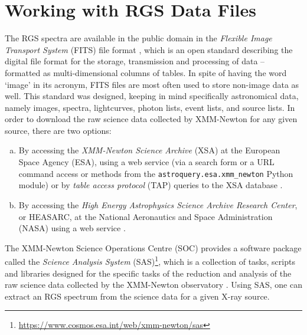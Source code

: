    \section{Working with RGS Data Files} \label{tool:rgs-files}
        The RGS spectra are available in the public domain in the \textit{Flexible Image Transport System} (FITS) file format \cite{chiappetti2018definition}, which is an open standard describing the digital file format for the storage, transmission and processing of data – formatted as multi-dimensional columns of tables. In spite of having the word `image' in its acronym, FITS files are most often used to store non-image data as well. This standard was designed, keeping in mind specifically astronomical data, namely images, spectra, lightcurves, photon lists, event lists, and source lists. In order to download the raw science data collected by XMM-Newton for any given source, there are two options:
        \begin{enumerate}[a)]
            \item By accessing the \textit{XMM-Newton Science Archive} (XSA) at the European Space Agency (ESA), using a web service (via a search form or a URL command access or methods from the \texttt{astroquery.esa.xmm\_newton} Python module) or by  \textit{table access protocol} (TAP) queries to the XSA database \cite{arviset2002xmm}.
            
            \item By accessing the \textit{High Energy Astrophysics Science Archive Research Center}, or HEASARC, at the National Aeronautics and Space Administration (NASA) using a web service \cite{barrett1993heasarc}.
        \end{enumerate}
        
        The XMM-Newton Science Operations Centre (SOC) provides a software package called the \textit{Science Analysis System} (SAS)\footnote{\url{https://www.cosmos.esa.int/web/xmm-newton/sas}}, which is a collection of tasks, scripts and libraries designed for the specific tasks of the reduction and analysis of the raw science data collected by the XMM-Newton observatory \cite{de2019users}. Using SAS, one can extract an RGS spectrum from the science data for a given X-ray source.
        
